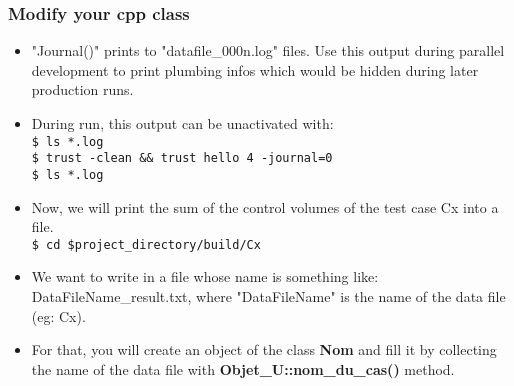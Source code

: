 \documentclass[10pt, hyperref={unicode=true,pdfusetitle, bookmarks=true,bookmarksnumbered=false,bookmarksopen=false, breaklinks=false,pdfborder={0 0 1},backref=true,colorlinks=true,linkcolor=darkblue,pageanchor, urlcolor=darkblue}]{beamer}
\begin{document}
\begin{frame}
\frametitle{Modify your cpp class}
\begin{block}{}

\begin{itemize}
\item "Journal()" prints to "datafile\_000n.log" files.
Use this output during parallel development to print plumbing infos which would be hidden during later production runs.

\item During run, this output can be unactivated with:\\
\texttt{\$ ls *.log}\\
\texttt{\$ trust -clean \&\& trust hello 4 -journal=0}\\
\texttt{\$ ls *.log}\\

\item Now, we will print the sum of the control volumes of the test case Cx into a file.\\
\texttt{\$ cd \$project\_directory/build/Cx}\\

\item We want to write in a file whose name is something like: DataFileName\_result.txt, where "DataFileName" is the name of the data file (eg: Cx).

\item For that, you will create an object of the class \textbf{Nom} and fill it by collecting the name of the data file with \textbf{Objet\_U::nom\_du\_cas()} method.
\end{itemize}

\end{block}
\end{frame}
\end{document}
